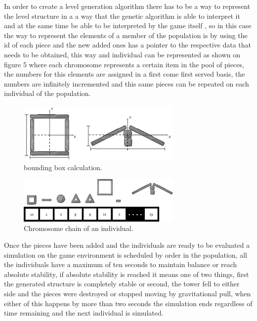 \documentclass[graybox]{svmult}
\begin{document}
In order to create a level generation algorithm there has to be a way to represent the level structure in a a way that the genetic algorithm is able to interpret it and at the same time be able to be interpreted by the game itself \cite{togelius2016Representationsforsearch-basedmethods}, so in this case the way to represent the elements of a member of the population is by using the id of each piece and the new added ones has a pointer to the respective data that needs to be obtained, this way and individual can be represented as shown on figure 5 where each chromosome represents a certain item in the pool of pieces, the numbers for this elements are assigned in a first come first served basis, the numbers are infinitely incremented and this same pieces can be repeated on each individual of the population. 

\begin{figure}[htbp]
\centerline{\includegraphics[width=80mm]{Images/bounding_box_calculation.png}}
\caption{bounding box calculation.}
\label{fig}
\end{figure}

\begin{figure}[htbp]
\centerline{\includegraphics[width=80mm]{Images/chromosome_chain_example.png}}
\caption{Chromosome chain of an individual.}
\label{fig}
\end{figure}

Once the pieces have been added and the individuals are ready to be evaluated a simulation on the game environment is scheduled by order in the population, all the individuals have a maximum of ten seconds to maintain balance or reach absolute stability, if absolute stability is reached it means one of two things, first the generated structure is completely stable or second, the tower fell to either side and the pieces were destroyed or stopped moving by gravitational pull, when either of this happens by more than two seconds the simulation ends regardless of time remaining and the next individual is simulated.
\end{document}
